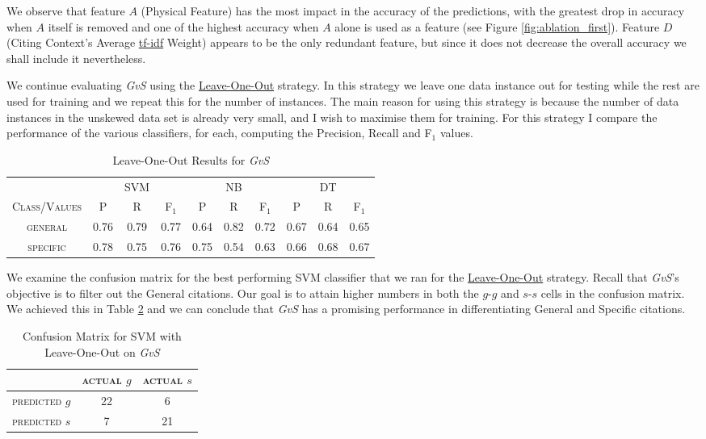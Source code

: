 We observe that feature $A$ (Physical Feature) has the most impact in the accuracy of the predictions, with the greatest drop in accuracy when $A$ itself is removed and one of the highest accuracy when $A$ alone is used as a feature (see Figure \ref{fig:ablation_first}). Feature $D$ (Citing Context's Average \url{tf-idf} Weight) appears to be the only redundant feature, but since it does not decrease the overall accuracy we shall include it nevertheless.

We continue evaluating {\it GvS} using the \url{Leave-One-Out} strategy. In this strategy we leave one data instance out for testing while the rest are used for training and we repeat this for the number of instances. The main reason for using this strategy is because the number of data instances in the unskewed data set is already very small, and I wish to maximise them for training. For this strategy I compare the performance of the various classifiers, for each, computing the Precision, Recall and F$_1$ values.

\begin{table}[h]
	\center
	\begin{tabular}{ c | c  c  c | c c c | c c c}
		& & SVM & & & NB & & & DT \\
		\textsc{Class/Values} & \textsc{P} & \textsc{R} & \textsc{F$_1$} & \textsc{P} & \textsc{R} & \textsc{F$_1$} & \textsc{P} & \textsc{R} & \textsc{F$_1$} \\
		\hline
		\textsc{general} 			& 0.76  &    0.79   &   0.77 & 0.64   &   0.82   &   0.72 & 0.67  &    0.64  &    0.65 \\
		\textsc{specific} 			& 0.78  &    0.75   &   0.76 & 0.75   &   0.54   &   0.63 & 0.66  &    0.68  &    0.67 \\
	\end{tabular}
	\caption{Leave-One-Out Results for {\it GvS}}
	\label{tab:firsttieresults}
\end{table}

We examine the confusion matrix for the best performing SVM classifier that we ran for the \url{Leave-One-Out} strategy. Recall that {\it GvS}'s objective is to filter out the General citations. Our goal is to attain higher numbers in both the $g$-$g$ and $s$-$s$ cells in the confusion matrix. We achieved this in Table \ref{tab:svmconfusionmatrix} and we can conclude that {\it GvS} has a promising performance in differentiating General and Specific citations.

\begin{table}[h]
	\center
	\begin{tabular}{ c | c  c }
		 & \textsc{actual $g$} & \textsc{actual $s$} \\
		\hline
		\textsc{predicted $g$} 	& 22 & 6 \\
		\textsc{predicted $s$}		& 7 & 21
	\end{tabular}
	\caption{Confusion Matrix for SVM with Leave-One-Out on {\it GvS}}
	\label{tab:svmconfusionmatrix}
\end{table}

